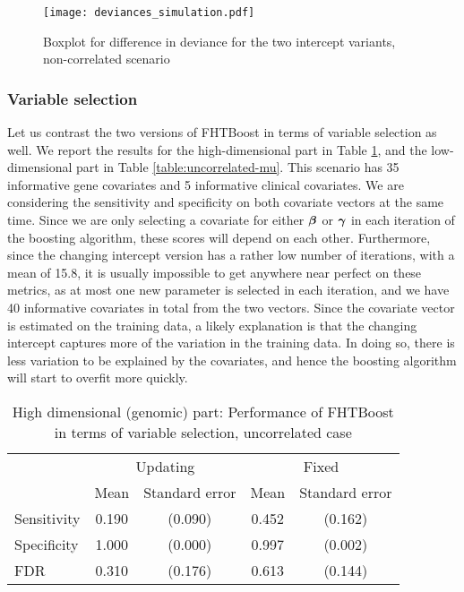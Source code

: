 \begin{figure}
\caption{Boxplot for difference in deviance for the two intercept variants, non-correlated scenario}
\label{fig:simulation-uncorrelated-deviances-boxplot}
\centering
\texttt{[image: deviances\_simulation.pdf]}
\end{figure}

\subsubsection{Variable selection}
Let us contrast the two versions of FHTBoost in terms of variable selection as well.
We report the results for the high-dimensional part in Table \ref{table:uncorrelated-y0}, and the low-dimensional part in Table \ref{table:uncorrelated-mu}.
This scenario has 35 informative gene covariates and 5 informative clinical covariates.
We are considering the sensitivity and specificity on both covariate vectors at the same time.
Since we are only selecting a covariate for either $\boldsymbol{\beta}$ or $\boldsymbol{\gamma}$ in each iteration of the boosting algorithm, these scores will depend on each other.
Furthermore, since the changing intercept version has a rather low number of iterations, with a mean of 15.8, it is usually impossible to get anywhere near perfect on these metrics, as at most one new parameter is selected in each iteration, and we have 40 informative covariates in total from the two vectors.
Since the covariate vector is estimated on the training data, a likely explanation is that the changing intercept captures more of the variation in the training data.
In doing so, there is less variation to be explained by the covariates, and hence the boosting algorithm will start to overfit more quickly.

\begin{table}
\caption{High dimensional (genomic) part: Performance of FHTBoost in terms of variable selection, uncorrelated case}
\label{table:uncorrelated-y0}
\centering
\begin{tabular}{l|cc|cc}
\toprule
& \multicolumn{2}{c}{Updating} & \multicolumn{2}{c}{Fixed} \\
& Mean & Standard error & Mean & Standard error \\
\hline
Sensitivity & 0.190 & (0.090) & 0.452 & (0.162) \\
Specificity & 1.000 & (0.000) & 0.997 & (0.002) \\
FDR         & 0.310 & (0.176) & 0.613 & (0.144) \\
\bottomrule
\end{tabular}
\end{table}

